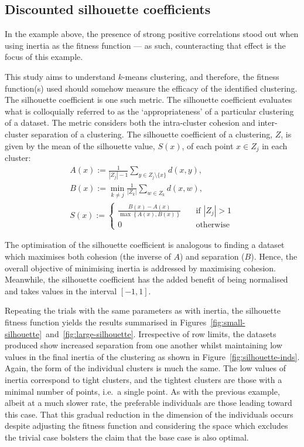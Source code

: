 \subsection{Discounted silhouette coefficients}

In the example above, the presence of strong positive correlations stood out
when using inertia as the fitness function --- as such, counteracting that
effect is the focus of this example.

This study aims to understand \(k\)-means clustering, and therefore, the fitness
function(s) used should somehow measure the efficacy of the identified
clustering. The silhouette coefficient is one such metric. The silhouette
coefficient evaluates what is colloquially referred to as the `appropriateness'
of a particular clustering of a dataset. The metric considers both the
intra-cluster cohesion and inter-cluster separation of a clustering. The
silhouette coefficient of a clustering, \(Z\), is given by the mean of the
silhouette value, \(S(x)\), of each point \(x \in Z_j\) in each cluster:
\begin{equation}
    \begin{gathered}
        A(x) := \frac{1}{|Z_j| - 1} \sum_{y \in Z_j \setminus \{x\}} d(x, y),
        \\
        B(x) := \min_{k \neq j} \frac{1}{|Z_k|} \sum_{w \in Z_k} d(x, w),
        \\
        S(x) :=
            \begin{cases}
                \frac{B(x) - A(x)}{\max\left\{A(x), B(x)\right\}}
                &\quad \text{if } |Z_j| > 1\\
                0 &\quad \text{otherwise}
            \end{cases}
    \end{gathered}\label{eq:silhouette}
\end{equation}

The optimisation of the silhouette coefficient is analogous to finding a dataset
which maximises both cohesion (the inverse of \(A\)) and separation (\(B\)).
Hence, the overall objective of minimising inertia is addressed by maximising
cohesion. Meanwhile, the silhouette coefficient has the added benefit of being
normalised and takes values in the interval \(\left[-1, 1\right]\).

Repeating the trials with the same parameters as with inertia, the silhouette
fitness function yields the results summarised in
Figures~\ref{fig:small-silhouette}~and~\ref{fig:large-silhouette}. Irrespective
of row limits, the datasets produced show increased separation from one another
whilst maintaining low values in the final inertia of the clustering as shown in
Figure~\ref{fig:silhouette-inds}. Again, the form of the individual clusters is
much the same. The low values of inertia correspond to tight clusters, and the
tightest clusters are those with a minimal number of points, i.e.\ a single
point. As with the previous example, albeit at a much slower rate, the
preferable individuals are those leading toward this case. That this gradual
reduction in the dimension of the individuals occurs despite adjusting the
fitness function and considering the space which excludes the trivial case
bolsters the claim that the base case is also optimal.

